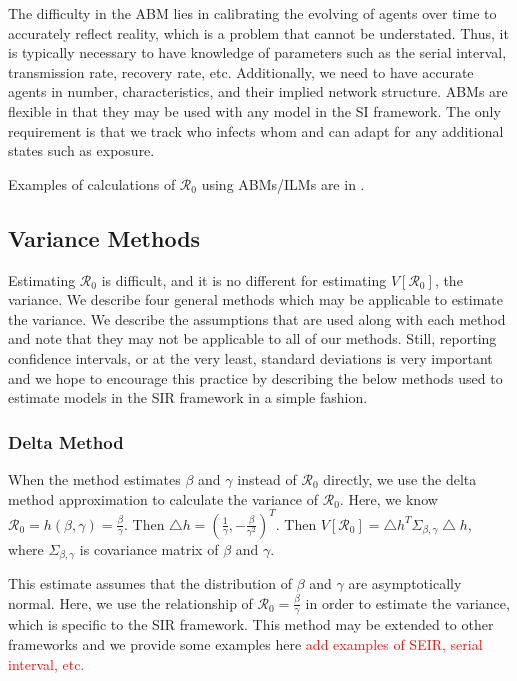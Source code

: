 \documentclass[12pt]{article}
\newcommand{\com}[1]{\textcolor{red}{ #1}}
\newcommand{\rr}{\ensuremath{\mathcal{R}_0}}
\begin{document}
The difficulty in the ABM lies in calibrating the evolving of agents over time to accurately reflect reality, which is a problem that cannot be understated.  Thus, it is typically necessary to have knowledge of parameters such as the serial interval, transmission rate, recovery rate, etc.  Additionally, we need to have accurate agents in number, characteristics, and their implied network structure.  ABMs are flexible in that they may be used with any model in the SI framework.  The only requirement is that we track who infects whom and can adapt for any additional states such as exposure.

Examples of calculations of $\rr$ using ABMs/ILMs are in \cite{breban2007,ahmed2013variance}.





\subsection{Variance Methods}
\label{sec:methods}

Estimating $\rr$ is difficult, and it is no different for estimating $V[\rr]$, the variance.  We describe four general methods which may be applicable to estimate the variance.  We describe the assumptions that are used along with each method and note that they may not be applicable to all of our methods.  Still, reporting confidence intervals, or at the very least, standard deviations is very important and we hope to encourage this practice by describing the below methods used to estimate models in the SIR framework in a simple fashion.


\subsubsection{Delta Method}\label{delta-method}

When the method estimates \(\beta\) and \(\gamma\) instead of \(\rr\) directly, we use the delta method approximation to calculate the
variance of \(\rr\). Here, we know \(\rr = h(\beta, \gamma) = \frac{\beta}{\gamma}\). Then \(\bigtriangleup h = (\frac{1}{\gamma},  -\frac{\beta}{\gamma^2})^T\).  Then \(V[\rr] = \bigtriangleup h^T \Sigma_{\beta, \gamma} \bigtriangleup h\), where \(\Sigma_{\beta, \gamma}\) is covariance matrix of \(\beta\) and \(\gamma\).

This estimate assumes that the distribution of $\beta$ and $\gamma$ are asymptotically normal.  Here, we use the relationship of $\rr = \frac{\beta}{\gamma}$ in order to estimate the variance, which is specific to the SIR framework.  This method may be extended to other frameworks and we provide some examples here \com{add examples of SEIR, serial interval, etc.}
\end{document}
